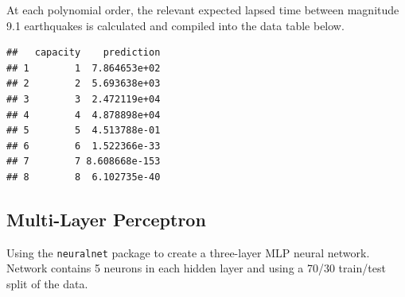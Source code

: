 At each polynomial order, the relevant expected lapsed time between
magnitude 9.1 earthquakes is calculated and compiled into the data table
below.

\begin{Shaded}
\begin{Highlighting}[]
\OtherTok{\textless{}{-}} \SpecialCharTok{:}
\OtherTok{\textless{}{-}} 

\OtherTok{\textless{}{-}} \NormalTok{(}\SpecialCharTok{\textasciitilde{}} 
\OtherTok{\textless{}{-}}  \NormalTok{(} \NormalTok{))}
\OtherTok{\textless{}{-}} \SpecialCharTok{/}\SpecialCharTok{\^{}}
\NormalTok{\}}

\end{Highlighting}
\end{Shaded}

\begin{verbatim}
##   capacity    prediction
## 1        1  7.864653e+02
## 2        2  5.693638e+03
## 3        3  2.472119e+04
## 4        4  4.878898e+04
## 5        5  4.513788e-01
## 6        6  1.522366e-33
## 7        7 8.608668e-153
## 8        8  6.102735e-40
\end{verbatim}


\hypertarget{multi-layer-perceptron}{%
\subsection{Multi-Layer Perceptron}\label{multi-layer-perceptron}}

Using the \texttt{neuralnet} package \cite{neuralnet} to create a
three-layer MLP neural network. Network contains 5 neurons in each
hidden layer and using a 70/30 train/test split of the data.

